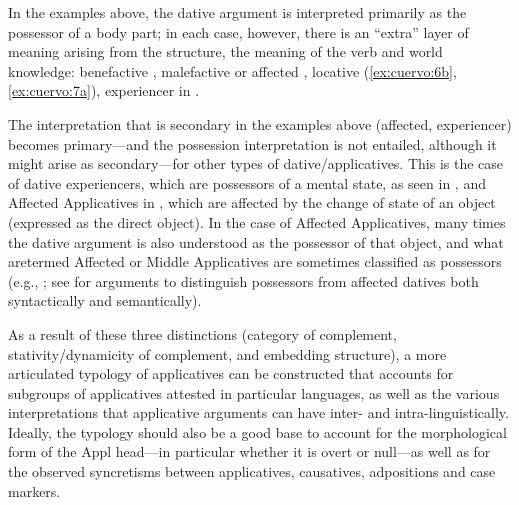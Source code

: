 \documentclass[output=paper,colorlinks,citecolor=brown,nonflat]{./langscibook}
\begin{document}
In the examples above, the dative argument is interpreted primarily as the possessor of a body part; in each case, however, there is an “extra” layer of meaning arising from the structure, the meaning of the verb and world knowledge: benefactive , malefactive or affected , locative (\ref{ex:cuervo:6b}, \ref{ex:cuervo:7a}), experiencer in .

The interpretation that is secondary in the examples above (affected, experiencer) becomes primary—and the possession interpretation is not entailed, although it might arise as secondary—for other types of dative/applicatives. This is the case of dative experiencers, which are possessors of a mental state, as seen in , and Affected Applicatives in , which are affected by the change of state of an object (expressed as the direct object). In the case of Affected Applicatives, many times the dative argument is also understood as the possessor of that object, and what aretermed Affected or Middle Applicatives are sometimes classified as possessors (e.g., \citealt{FernándezAlcalde2014}; see \citealt{Cuervo2003} for arguments to distinguish possessors from affected datives both syntactically and semantically).

As a result of these three distinctions (category of complement, stativity/dynamicity of complement, and embedding structure), a more articulated typology of applicatives can be constructed that accounts for subgroups of applicatives attested in particular languages, as well as the various interpretations that applicative arguments can have inter- and intra-linguistically. Ideally, the typology should also be a good base to account for the morphological form of the Appl head—in particular whether it is overt or null—as well as for the observed syncretisms between applicatives, causatives, adpositions and case markers.
\end{document}
